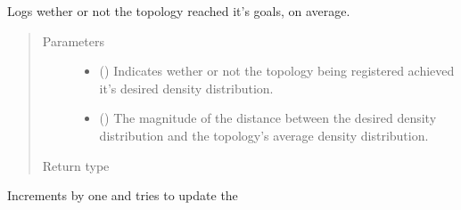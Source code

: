 \documentclass[letterpaper,10pt,english]{sphinxmanual}
\begin{document}
\begin{fulllineitems}
\begin{fulllineitems}
\end{fulllineitems}


\begin{fulllineitems}
\label{\detokenize{app.domain.helpers:app.domain.helpers.smart_dataclasses.LoggingData.log_topology_goal_performance}}
Logs wether or not the topology reached it’s goals, on average.
\begin{quote}\begin{description}
\item[{Parameters}] \leavevmode\begin{itemize}
\item {} 
 () \textendash{} Indicates wether or not the topology being registered
achieved it’s desired density distribution.

\item {} 
 () \textendash{} The magnitude of the distance between the desired density
distribution and the topology’s average density distribution.

\end{itemize}

\item[{Return type}] \leavevmode
{}

\end{description}\end{quote}

\end{fulllineitems}


\begin{fulllineitems}
\label{\detokenize{app.domain.helpers:app.domain.helpers.smart_dataclasses.LoggingData.register_convergence}}
Increments {\hyperref[\detokenize{app.domain.helpers:app.domain.helpers.smart_dataclasses.LoggingData.cswc}]{}} by one and tries to update the {\hyperref[\detokenize{app.domain.helpers:app.domain.helpers.smart_dataclasses.LoggingData.convergence_set}]{}}


\end{fulllineitems}
\end{fulllineitems}
\end{document}
